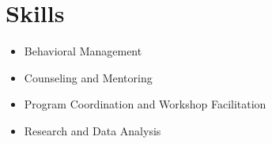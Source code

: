 \documentclass[letterpaper,11pt]{article}
\newenvironment{tightItemize}{%
  \begin{itemize}[leftmargin=0.15in]
  \setlength{\itemsep}{0pt}%
  \setlength{\parskip}{0pt}%
}{%
  \end{itemize}
}
\begin{document}
\section{Skills}
\begin{tightItemize}
    \item Behavioral Management
    \item Counseling and Mentoring
    \item Program Coordination and Workshop Facilitation
    \item Research and Data Analysis
\end{tightItemize}



\end{document}
